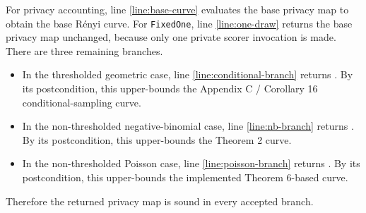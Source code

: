 \documentclass{article}
\begin{document}
For privacy accounting, line \ref{line:base-curve} evaluates the base privacy map to obtain the
base Rényi curve.
For \texttt{FixedOne}, line \ref{line:one-draw} returns the base
privacy map unchanged, because only one private scorer invocation is made.
There are three remaining branches.
\begin{itemize}
    \item In the thresholded geometric case, line \ref{line:conditional-branch} returns
    .
    By its postcondition, this upper-bounds the Appendix C / Corollary 16
    conditional-sampling curve.
    \item In the non-thresholded negative-binomial case, line \ref{line:nb-branch} returns
    .
    By its postcondition, this upper-bounds the Theorem 2 curve.
    \item In the non-thresholded Poisson case, line \ref{line:poisson-branch} returns
    . By its
    postcondition, this upper-bounds the implemented Theorem 6-based curve.
\end{itemize}

Therefore the returned privacy map is sound in every accepted branch.
\end{document}
